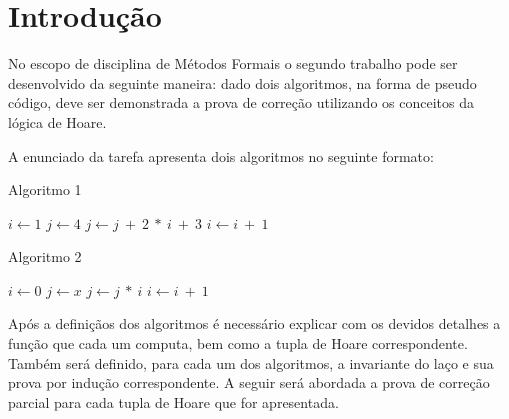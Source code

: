 \section{Introdução}
No escopo de disciplina de Métodos Formais o segundo trabalho pode ser
desenvolvido da seguinte maneira: dado dois algoritmos, na forma de pseudo
código, deve ser demonstrada a prova de correção utilizando os conceitos da
lógica de Hoare.

A enunciado da tarefa apresenta dois algoritmos no seguinte formato:

\begin{minipage}{6cm}
\null 
  \begin{algorithm}[H]
    \caption{Algoritmo 1}
      \State $i\gets 1$
      \State $j\gets 4$
      \State $j \gets j\ +\ 2\ *\ i\ +\ 3$
      \State $i\gets i\ +\ 1$
      \EndWhile\label{euclidendwhile}
      \EndFunction
  \end{algorithm}
\end{minipage}%
\begin{minipage}{6cm}
\null
  \begin{algorithm}[H]
    \caption{Algoritmo 2}
      \State $i\gets 0$
      \State $j\gets x$
      \State $j \gets j\ *\ i$
      \State $i\gets i\ +\ 1$
      \EndWhile\label{euclidendwhile}
      \EndFunction
  \end{algorithm}
\end{minipage}

\vspace{0.3cm}

Após a definiçãos dos algoritmos é necessário explicar com os devidos detalhes a
função que cada um computa, bem como a tupla de Hoare correspondente. Também
será definido, para cada um dos algoritmos, a invariante do laço e sua prova por
indução correspondente. A seguir será abordada a prova de correção parcial para
cada tupla de Hoare que for apresentada.
